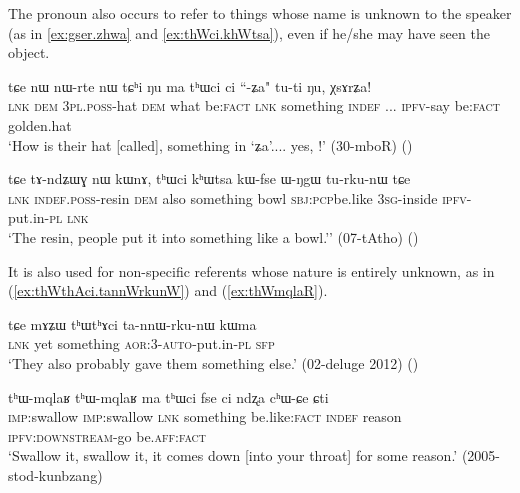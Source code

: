 The pronoun  also occurs to refer to things whose name is unknown to the speaker (as in \ref{ex:gser.zhwa} and \ref{ex:thWci.khWtsa}), even if he/she may have seen the object.
 
\begin{exe}
\ex \label{ex:gser.zhwa}
\gll tɕe nɯ nɯ-rte nɯ tɕʰi ŋu ma tʰɯci ci ``-ʑa" tu-ti ŋu, χsɤrʑa! \\
\textsc{lnk} \textsc{dem} \textsc{3pl}.\textsc{poss}-hat \textsc{dem} what be:\textsc{fact} \textsc{lnk} something \textsc{indef} {  ...} \textsc{ipfv}-say be:\textsc{fact} golden.hat \\
\glt `How is their hat [called], something in `ʑa'.... yes, !' (30-mboR)
()
\end{exe}

\begin{exe}
\ex \label{ex:thWci.khWtsa}
\gll  tɕe tɤ-ndʑɯɣ nɯ kɯnɤ, tʰɯci kʰɯtsa kɯ-fse ɯ-ŋgɯ tu-rku-nɯ tɕe   \\
\textsc{lnk} \textsc{indef}.\textsc{poss}-resin \textsc{dem} also something bowl \textsc{sbj}:\textsc{pcp}be.like \textsc{3sg}-inside \textsc{ipfv}-put.in-\textsc{pl} \textsc{lnk}   \\
\glt `The resin, people put it into something like a bowl.'' (07-tAtho)
()
\end{exe}

It is also used for non-specific referents whose nature is entirely unknown, as in  (\ref{ex:thWthAci.tannWrkunW}) and (\ref{ex:thWmqlaR}).

\begin{exe}
\ex \label{ex:thWthAci.tannWrkunW}
\gll   tɕe mɤʑɯ tʰɯtʰɤci ta-nnɯ-rku-nɯ kɯma  \\
\textsc{lnk} yet something \textsc{aor}:3\flobv{}-\textsc{auto}-put.in-\textsc{pl} \textsc{sfp} \\
\glt `They also probably gave them something else.' (02-deluge 2012)
()
 \end{exe}
 
  \begin{exe}
\ex \label{ex:thWmqlaR}
\gll  tʰɯ-mqlaʁ tʰɯ-mqlaʁ ma tʰɯci fse ci ndʐa cʰɯ-ɕe ɕti \\
 \textsc{imp}:swallow  \textsc{imp}:swallow \textsc{lnk} something be.like:\textsc{fact} \textsc{indef} reason \textsc{ipfv}:\textsc{downstream}-go be.\textsc{aff}:\textsc{fact} \\
\glt `Swallow it, swallow it, it comes down [into your throat] for some reason.' (2005-stod-kunbzang)
  \end{exe}

